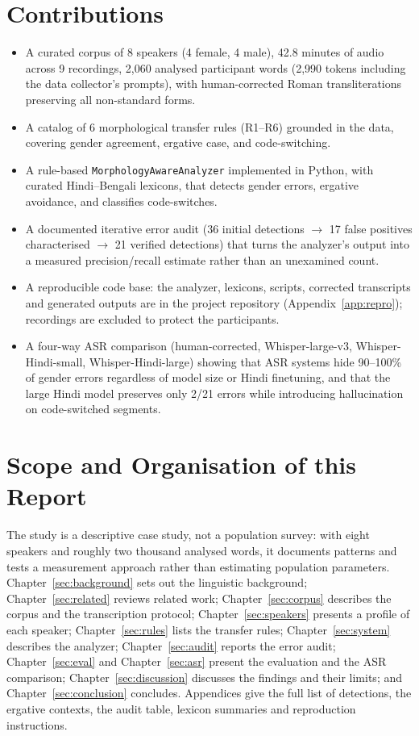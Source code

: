 \documentclass[11pt,a4paper]{report}
\begin{document}
\section{Contributions}

\begin{itemize}
  \item A curated corpus of 8 speakers (4 female, 4 male), 42.8 minutes of audio across 9 recordings, 2,060 analysed participant words (2,990 tokens including the data collector's prompts), with human-corrected Roman transliterations preserving all non-standard forms.
  \item A catalog of 6 morphological transfer rules (R1--R6) grounded in the data, covering gender agreement, ergative case, and code-switching.
  \item A rule-based \texttt{MorphologyAwareAnalyzer} implemented in Python, with curated Hindi--Bengali lexicons, that detects gender errors, ergative avoidance, and classifies code-switches.
  \item A documented iterative error audit (36 initial detections $\to$ 17 false positives characterised $\to$ 21 verified detections) that turns the analyzer's output into a measured precision/recall estimate rather than an unexamined count.
  \item A reproducible code base: the analyzer, lexicons, scripts, corrected transcripts and generated outputs are in the project repository (Appendix~\ref{app:repro}); recordings are excluded to protect the participants.
  \item A four-way ASR comparison (human-corrected, Whisper-large-v3, Whisper-Hindi-small, Whisper-Hindi-large) showing that ASR systems hide 90--100\% of gender errors regardless of model size or Hindi finetuning, and that the large Hindi model preserves only 2/21 errors while introducing hallucination on code-switched segments.
\end{itemize}

\section{Scope and Organisation of this Report}

The study is a descriptive case study, not a population survey: with eight speakers and roughly two thousand analysed words, it documents patterns and tests a measurement approach rather than estimating population parameters. Chapter~\ref{sec:background} sets out the linguistic background; Chapter~\ref{sec:related} reviews related work; Chapter~\ref{sec:corpus} describes the corpus and the transcription protocol; Chapter~\ref{sec:speakers} presents a profile of each speaker; Chapter~\ref{sec:rules} lists the transfer rules; Chapter~\ref{sec:system} describes the analyzer; Chapter~\ref{sec:audit} reports the error audit; Chapter~\ref{sec:eval} and Chapter~\ref{sec:asr} present the evaluation and the ASR comparison; Chapter~\ref{sec:discussion} discusses the findings and their limits; and Chapter~\ref{sec:conclusion} concludes. Appendices give the full list of detections, the ergative contexts, the audit table, lexicon summaries and reproduction instructions.
\end{document}
